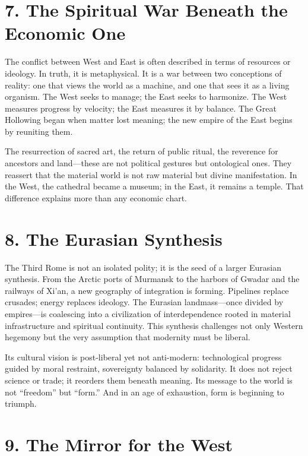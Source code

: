 \documentclass[11pt,twoside]{book}
\begin{document}
\section*{7. The Spiritual War Beneath the Economic One}

The conflict between West and East is often described in terms of resources or ideology.  
In truth, it is metaphysical.  
It is a war between two conceptions of reality: one that views the world as a machine, and one that sees it as a living organism.  
The West seeks to manage; the East seeks to harmonize.  
The West measures progress by velocity; the East measures it by balance.  
The Great Hollowing began when matter lost meaning; the new empire of the East begins by reuniting them.

The resurrection of sacred art, the return of public ritual, the reverence for ancestors and land—these are not political gestures but ontological ones.  
They reassert that the material world is not raw material but divine manifestation.  
In the West, the cathedral became a museum; in the East, it remains a temple.  
That difference explains more than any economic chart.

\section*{8. The Eurasian Synthesis}

The Third Rome is not an isolated polity; it is the seed of a larger Eurasian synthesis.  
From the Arctic ports of Murmansk to the harbors of Gwadar and the railways of Xi’an, a new geography of integration is forming.  
Pipelines replace crusades; energy replaces ideology.  
The Eurasian landmass—once divided by empires—is coalescing into a civilization of interdependence rooted in material infrastructure and spiritual continuity.  
This synthesis challenges not only Western hegemony but the very assumption that modernity must be liberal.

Its cultural vision is post-liberal yet not anti-modern: technological progress guided by moral restraint, sovereignty balanced by solidarity.  
It does not reject science or trade; it reorders them beneath meaning.  
Its message to the world is not “freedom” but “form.”  
And in an age of exhaustion, form is beginning to triumph.

\section*{9. The Mirror for the West}
\end{document}
